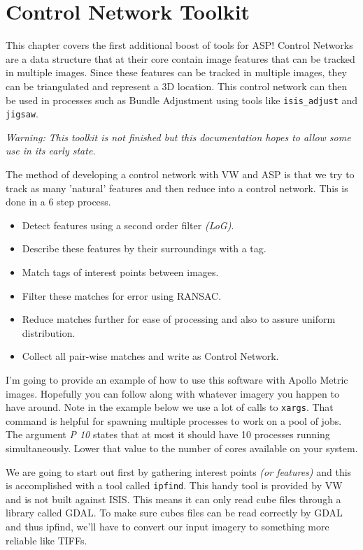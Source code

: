 \chapter{Control Network Toolkit}
\label{ch:controlnettk}

This chapter covers the first additional boost of tools for \ac{ASP}!
Control Networks are a data structure that at their core contain image
features that can be tracked in multiple images. Since these features
can be tracked in multiple images, they can be triangulated and
represent a 3D location. This control network can then be used in
processes such as Bundle Adjustment using tools like
\texttt{isis\_adjust} and \texttt{jigsaw}.

\emph{Warning: This toolkit is not finished but this documentation
  hopes to allow some use in its early state.}

The method of developing a control network with \ac{VW} and \ac{ASP}
is that we try to track as many 'natural' features and then reduce
into a control network. This is done in a 6 step process.

\begin{itemize}
\item Detect features using a second order filter \emph{(LoG)}.
\item Describe these features by their surroundings with a tag.
\item Match tags of interest points between images.
\item Filter these matches for error using RANSAC.
\item Reduce matches further for ease of processing and also to assure uniform distribution.
\item Collect all pair-wise matches and write as Control Network.
\end{itemize}

I'm going to provide an example of how to use this software with
Apollo Metric images. Hopefully you can follow along with whatever
imagery you happen to have around. Note in the example below we use a
lot of calls to \texttt{xargs}. That command is helpful for spawning
multiple processes to work on a pool of jobs. The argument \emph{\-P 10}
states that at most it should have 10 processes running
simultaneously. Lower that value to the number of cores available on
your system.

We are going to start out first by gathering interest points \emph{(or
  features)} and this is accomplished with a tool called
\texttt{ipfind}. This handy tool is provided by \ac{VW} and is not
built against ISIS. This means it can only read cube files through a
library called GDAL. To make sure cubes files can be read correctly by
GDAL and thus ipfind, we'll have to convert our input imagery to
something more reliable like TIFFs.

